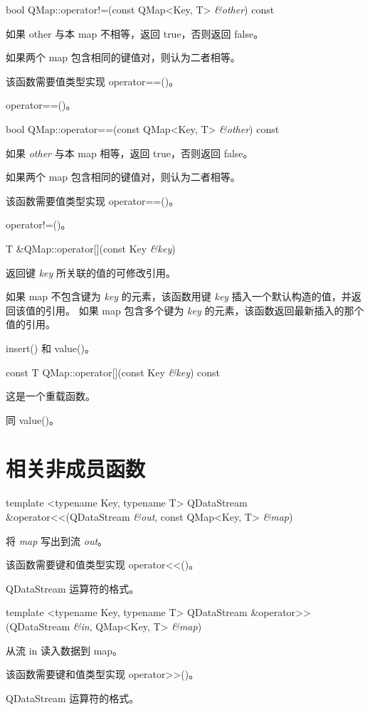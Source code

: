 \splitLine

bool QMap::operator!=(const QMap<Key, T> \emph{\&other}) const

如果 other 与本 map 不相等，返回 true，否则返回 false。

如果两个 map 包含相同的键值对，则认为二者相等。

该函数需要值类型实现 operator==()。

\begin{notice}[另请参阅]
operator==()。
\end{notice}

\splitLine

bool QMap::operator==(const QMap<Key, T> \emph{\&other}) const

如果 \emph{other} 与本 map 相等，返回 true，否则返回 false。

如果两个 map 包含相同的键值对，则认为二者相等。

该函数需要值类型实现 operator==()。

\begin{notice}[另请参阅]
operator!=()。
\end{notice}

\splitLine

T \&QMap::operator[](const Key \emph{\&key})

返回键 \emph{key} 所关联的值的可修改引用。

如果 map 不包含键为 \emph{key} 的元素，该函数用键 \emph{key} 插入一个默认构造的值，并返回该值的引用。
如果 map 包含多个键为  \emph{key} 的元素，该函数返回最新插入的那个值的引用。

\begin{notice}[另请参阅]
insert() 和 value()。
\end{notice}


\splitLine

const T QMap::operator[](const Key \emph{\&key}) const

这是一个重载函数。

同 value()。

\section{相关非成员函数}

template <typename Key, typename T> QDataStream \&operator<<(QDataStream \emph{\&out}, const QMap<Key, T> \emph{\&map})

将 \emph{map} 写出到流 \emph{out}。

该函数需要键和值类型实现 operator<<()。

\begin{notice}[另请参阅]
QDataStream 运算符的格式。
\end{notice}

\splitLine

template <typename Key, typename T> QDataStream \&operator>>(QDataStream \emph{\&in}, QMap<Key, T> \emph{\&map})

从流 in 读入数据到 map。

该函数需要键和值类型实现 operator>>()。

\begin{notice}[另请参阅]
QDataStream 运算符的格式。
\end{notice}